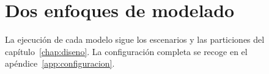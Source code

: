 \chapter{Dos enfoques de modelado}
\label{chap:modelos}

La ejecución de cada modelo sigue los escenarios y las particiones del capítulo~\ref{chap:diseno}. La configuración completa se recoge en el apéndice~\ref{app:configuracion}.



